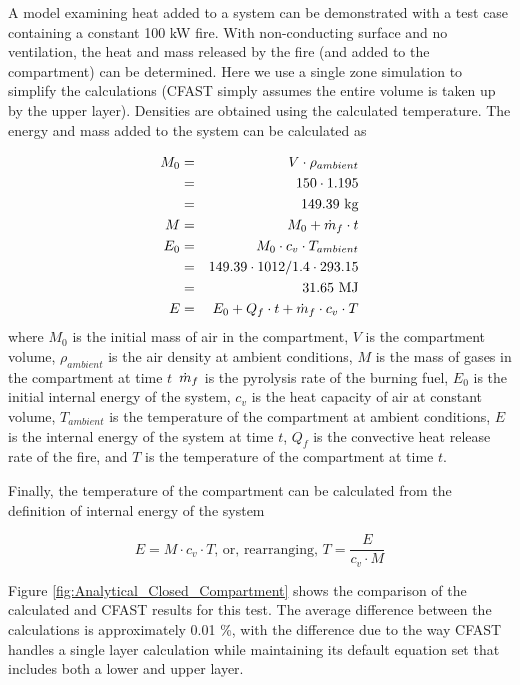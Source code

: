 A model examining heat added to a system can be demonstrated with a test case containing a constant 100 kW fire.  With non-conducting surface and no ventilation, the heat and mass released by the fire (and added to the compartment) can be determined.  Here we use a single zone simulation to simplify the calculations (CFAST simply assumes the entire volume is taken up by the upper layer).  Densities are obtained using the calculated temperature. The energy and mass added to the system can be calculated as

\begin{eqnarray}
M_0 &=& V \cdot \rho_{ambient} \nonumber \\
 &=& 150 \cdot 1.195 \nonumber \\
 &=& 149.39 \text{\ kg} \nonumber \\
M &=& M_0 + \dot{m}_f \cdot t \\
E_0 &=& M_0 \cdot c_v \cdot T_{ambient} \nonumber \\
 &=& 149.39 \cdot 1012/1.4 \cdot 293.15 \nonumber \\
 &=& 31.65  \text{\ MJ} \nonumber \\
E &=& E_0 + Q_f \cdot t + \dot{m}_f \cdot c_v \cdot T
\end{eqnarray}
where $M_0$ is the initial mass of air in the compartment, $V$ is the compartment volume, $\rho_{ambient}$ is the air density at ambient conditions, $M$ is the mass of gases in the compartment at time $t$\, $\dot{m}_f$ is the pyrolysis rate of the burning fuel, $E_0$ is the initial internal energy of the system, $c_v$ is the heat capacity of air at constant volume, $T_{ambient}$ is the temperature of the compartment at ambient conditions, $E$ is the internal energy of the system at time $t$, $Q_f$ is the convective heat release rate of the fire, and $T$ is the temperature of the compartment at time $t$.

Finally, the temperature of the compartment can be calculated from the definition of internal energy of the system

\begin{equation}
E = M \cdot c_v \cdot T \text{, or, rearranging, } T = \frac{E}{c_v \cdot M}
\end{equation}

Figure \ref{fig:Analytical_Closed_Compartment} shows the comparison of the calculated and CFAST results for this test. The average difference between the calculations is approximately 0.01 \%, with the difference due to the way CFAST handles a single layer calculation while maintaining its default equation set that includes both a lower and upper layer.


